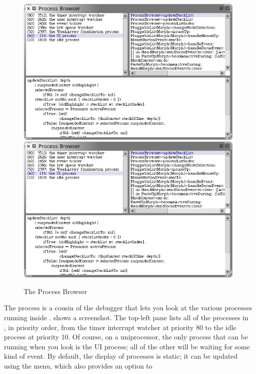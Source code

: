 \documentclass[a4paper,10pt,twoside]{book}
\begin{document}
\begin{figure}[btp]
	\begin{center}
	\ifluluelse
		{\includegraphics[width=\textwidth]{processBrowser}}
		{\includegraphics[scale=0.7]{processBrowser}}
	\end{center}
	\caption{The Process Browser}
	\label{fig:processBrowser}
\end{figure}

The process  is a cousin of the debugger that lets you look at the various processes running inside \sq.
 shows a screenshot.
The top-left pane lists all of the processes in \sq, in priority order, from the timer interrupt watcher at priority 80 to the idle process at priority 10.
Of course, on a uniprocessor, the only process that can be running when you look is the UI process; all of the other will be waiting for some kind of event. 
By default, the display of processes is static; it can be updated using the  menu, which also provides an option to 
\end{document}
